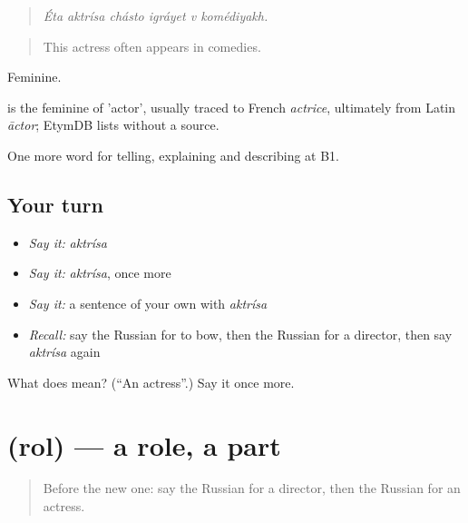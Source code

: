 \begin{quote}
\emph{Éta aktrísa chásto igráyet v komédiyakh.}
\end{quote}

\begin{quote}
This actress often appears in comedies.
\end{quote}

Feminine.

\begin{cousinweb}
\emph{} is the feminine of \emph{} 'actor', usually traced to French \emph{actrice}, ultimately from Latin \emph{āctor}; EtymDB lists \emph{} without a source.
\end{cousinweb}

\begin{grammarlens}[title={What you've built}]
One more word for telling, explaining and describing at B1.
\end{grammarlens}

\subsection*{Your turn}
\begin{itemize}
\raggedright
  \item \emph{Say it:} \emph{aktrísa}
  \item \emph{Say it:} \emph{aktrísa}, once more
  \item \emph{Say it:} a sentence of your own with \emph{aktrísa}
  \item \emph{Recall:} say the Russian for to bow, then the Russian for a director, then say \emph{aktrísa} again
\end{itemize}

\begin{tcolorbox}[breakable,colback=teal!4,colframe=teal!35!black,title={Before you move on}]
What does  mean? (\textquotedblleft{}An actress\textquotedblright{}.) Say it once more.
\end{tcolorbox}
\section[\texorpdfstring{\ru{роль} (rol)}{роль (rol)}]{ (rol) — a role, a part}

\label{lesson:RU-C520-rol}



\begin{quote}
Before the new one: say the Russian for a director, then the Russian for an actress.
\end{quote}

